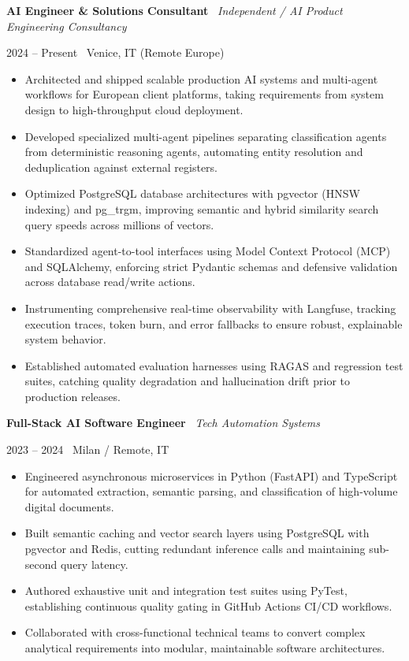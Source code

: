 \documentclass[a4paper,10pt]{article}
\newcommand{\role}[4]{%
  \vspace{2pt}\noindent
  \begin{minipage}[t]{0.70\textwidth}\raggedright\textbf{#1} \textbullet\ \textit{#3}\end{minipage}%
  \hfill
  \begin{minipage}[t]{0.28\textwidth}\raggedleft\footnotesize\color{gray}#2 \textbullet\ #4\end{minipage}%
  \vspace{1pt}%
}
\begin{document}
\role{AI Engineer \& Solutions Consultant}{2024 -- Present}{Independent / AI Product Engineering Consultancy}{Venice, IT (Remote Europe)}
\begin{itemize}
  \item Architected and shipped scalable production AI systems and multi-agent workflows for European client platforms, taking requirements from system design to high-throughput cloud deployment.
  \item Developed specialized multi-agent pipelines separating classification agents from deterministic reasoning agents, automating entity resolution and deduplication against external registers.
  \item Optimized PostgreSQL database architectures with pgvector (HNSW indexing) and pg\_trgm, improving semantic and hybrid similarity search query speeds across millions of vectors.
  \item Standardized agent-to-tool interfaces using Model Context Protocol (MCP) and SQLAlchemy, enforcing strict Pydantic schemas and defensive validation across database read/write actions.
  \item Instrumenting comprehensive real-time observability with Langfuse, tracking execution traces, token burn, and error fallbacks to ensure robust, explainable system behavior.
  \item Established automated evaluation harnesses using RAGAS and regression test suites, catching quality degradation and hallucination drift prior to production releases.
\end{itemize}

\vspace{3pt}
\role{Full-Stack AI Software Engineer}{2023 -- 2024}{Tech Automation Systems}{Milan / Remote, IT}
\begin{itemize}
  \item Engineered asynchronous microservices in Python (FastAPI) and TypeScript for automated extraction, semantic parsing, and classification of high-volume digital documents.
  \item Built semantic caching and vector search layers using PostgreSQL with pgvector and Redis, cutting redundant inference calls and maintaining sub-second query latency.
  \item Authored exhaustive unit and integration test suites using PyTest, establishing continuous quality gating in GitHub Actions CI/CD workflows.
  \item Collaborated with cross-functional technical teams to convert complex analytical requirements into modular, maintainable software architectures.
\end{itemize}
\end{document}
